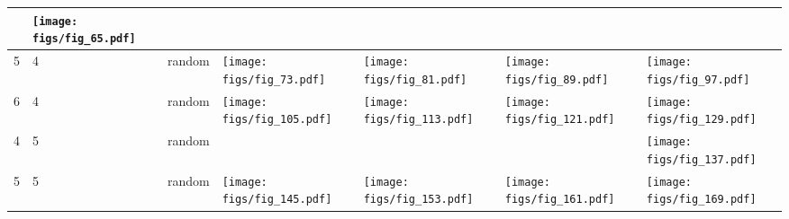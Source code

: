 \documentclass[oneside,canadian,landscape]{article}
\begin{document}
\begin{center}
\begin{longtable}{|l|l|l||l|l|l|l|}
&\begin{minipage}{3.5cm}
\texttt{[image: figs/fig\_65.pdf]}
\end{minipage}
&\\ \hline
5&4&random&\begin{minipage}{3.5cm}
\texttt{[image: figs/fig\_73.pdf]}
\end{minipage}
&\begin{minipage}{3.5cm}
\texttt{[image: figs/fig\_81.pdf]}
\end{minipage}
&\begin{minipage}{3.5cm}
\texttt{[image: figs/fig\_89.pdf]}
\end{minipage}
&\begin{minipage}{3.5cm}
\texttt{[image: figs/fig\_97.pdf]}
\end{minipage}
\\ \hline
6&4&random&\begin{minipage}{3.5cm}
\texttt{[image: figs/fig\_105.pdf]}
\end{minipage}
&\begin{minipage}{3.5cm}
\texttt{[image: figs/fig\_113.pdf]}
\end{minipage}
&\begin{minipage}{3.5cm}
\texttt{[image: figs/fig\_121.pdf]}
\end{minipage}
&\begin{minipage}{3.5cm}
\texttt{[image: figs/fig\_129.pdf]}
\end{minipage}
\\ \hline
4&5&random&&&&\begin{minipage}{3.5cm}
\texttt{[image: figs/fig\_137.pdf]}
\end{minipage}
\\ \hline
5&5&random&\begin{minipage}{3.5cm}
\texttt{[image: figs/fig\_145.pdf]}
\end{minipage}
&\begin{minipage}{3.5cm}
\texttt{[image: figs/fig\_153.pdf]}
\end{minipage}
&\begin{minipage}{3.5cm}
\texttt{[image: figs/fig\_161.pdf]}
\end{minipage}
&\begin{minipage}{3.5cm}
\texttt{[image: figs/fig\_169.pdf]}
\end{minipage}
\\ \hline

\end{longtable}
\end{center}
\end{document}
